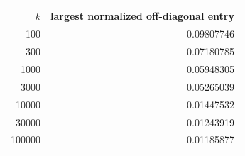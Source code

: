 \begin{tabular}{rr}
\toprule
$k$ & largest normalized off-diagonal entry\\
\midrule
100 & 0.09807746\\
300 & 0.07180785\\
1000 & 0.05948305\\
3000 & 0.05265039\\
10000 & 0.01447532\\
30000 & 0.01243919\\
100000 & 0.01185877\\
\bottomrule
\end{tabular}